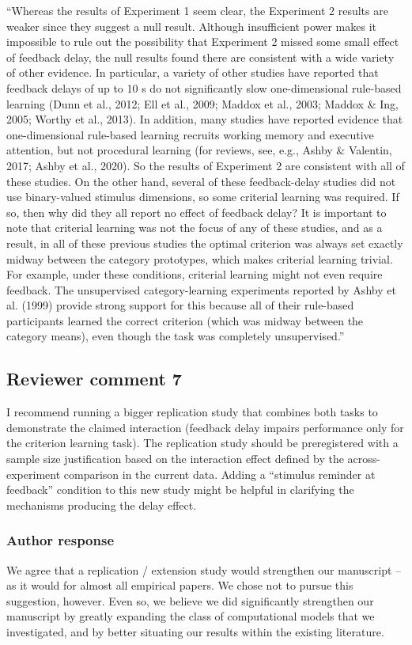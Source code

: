 \documentclass[12pt]{article}
\begin{document}
``Whereas the results of Experiment 1 seem clear, the
Experiment 2 results are weaker since they suggest a null
result. Although insufficient power makes it impossible to
rule out the possibility that Experiment 2 missed some small
effect of feedback delay, the null results found there are
consistent with a wide variety of other evidence. In
particular, a variety of other studies have reported that
feedback delays of up to 10 s do not significantly slow
one-dimensional rule-based learning (Dunn et al., 2012; Ell
et al., 2009; Maddox et al., 2003; Maddox \& Ing, 2005;
Worthy et al., 2013). In addition, many studies have
reported evidence that one-dimensional rule-based learning
recruits working memory and executive attention, but not
procedural learning (for reviews, see, e.g., Ashby \&
Valentin, 2017; Ashby et al., 2020). So the results of
Experiment 2 are consistent with all of these studies. On
the other hand, several of these feedback-delay studies did
not use binary-valued stimulus dimensions, so some criterial
learning was required. If so, then why did they all report
no effect of feedback delay? It is important to note that
criterial learning was not the focus of any of these
studies, and as a result, in all of these previous studies
the optimal criterion was always set exactly midway between
the category prototypes, which makes criterial learning
trivial. For example, under these conditions, criterial
learning might not even require feedback. The unsupervised
category-learning experiments reported by Ashby et al.
(1999) provide strong support for this because all of their
rule-based participants learned the correct criterion (which
was midway between the category means), even though the task
was completely unsupervised.''

\subsection{Reviewer comment 7}
I recommend running a bigger replication study that combines
both tasks to demonstrate the claimed interaction (feedback
delay impairs performance only for the criterion learning
task). The replication study should be preregistered with a
sample size justification based on the interaction effect
defined by the across-experiment comparison in the current
data. Adding a ``stimulus reminder at feedback'' condition
to this new study might be helpful in clarifying the
mechanisms producing the delay effect.

\subsubsection{Author response}
We agree that a replication / extension study would
strengthen our manuscript -- as it would for almost all
empirical papers. We chose not to pursue this suggestion,
however.  Even so, we believe we did significantly
strengthen our manuscript by greatly expanding the class of
computational models that we investigated, and by better
situating our results within the existing literature.
\end{document}
